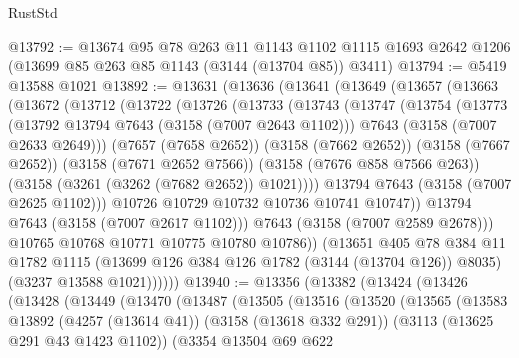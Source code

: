 \begin{lexlean}{RustStd}
\begin{coremodule}
@13792 := @13674
    @95
    @78
    @263
    @11
    @1143
    @1102
    @1115
    @1693
    @2642
    @1206
    (@13699 @85 @263 @85 @1143 (@3144 (@13704 @85)) @3411)
@13794 := @5419 @13588 @1021
@13892 := @13631
    (@13636
      (@13641
        (@13649
          (@13657
            (@13663
              (@13672
                (@13712
                  (@13722
                    (@13726
                      (@13733
                        (@13743
                          (@13747
                            (@13754
                              (@13773
                                (@13792 @13794 @7643 (@3158 (@7007 @2643 @1102)))
                                @7643
                                (@3158 (@7007 @2633 @2649)))
                              (@7657 (@7658 @2652))
                              (@3158 (@7662 @2652))
                              (@3158 (@7667 @2652))
                              (@3158 (@7671 @2652 @7566))
                              (@3158 (@7676 @858 @7566 @263))
                              (@3158 (@3261 (@3262 (@7682 @2652)) @1021))))
                          @13794
                          @7643
                          (@3158 (@7007 @2625 @1102)))
                        @10726
                        @10729
                        @10732
                        @10736
                        @10741
                        @10747))
                    @13794
                    @7643
                    (@3158 (@7007 @2617 @1102)))
                  @7643
                  (@3158 (@7007 @2589 @2678)))
                @10765
                @10768
                @10771
                @10775
                @10780
                @10786))
            (@13651
              @405
              @78
              @384
              @11
              @1782
              @1115
              (@13699 @126 @384 @126 @1782 (@3144 (@13704 @126)) @8035)
              (@3237 @13588 @1021))))))
@13940 := @13356
    (@13382
      (@13424
        (@13426
          (@13428
            (@13449
              (@13470
                (@13487
                  (@13505
                    (@13516
                      (@13520
                        (@13565
                          (@13583
                            @13892
                            (@4257 (@13614 @41))
                            (@3158 (@13618 @332 @291))
                            (@3113 (@13625 @291 @43 @1423 @1102))
                            (@3354
                              @13504
                              @69
                              @622

\end{coremodule}
\end{lexlean}
